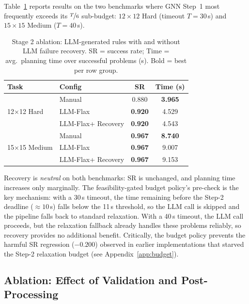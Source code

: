 \documentclass[letterpaper, 10pt, journal, twoside]{IEEEtran}
\newcommand{\tref}[1]{Table~\ref{#1}}
\newcommand{\method}{LLM-Flax\xspace}
\begin{document}
\tref{tab:stage2} reports results on the two benchmarks where GNN Step~1 most frequently exceeds its $\nicefrac{T}{6}$ sub-budget: $12{\times}12$ Hard (timeout $T{=}30$\,s) and $15{\times}15$ Medium ($T{=}40$\,s).

\begin{table}[t]
    \centering
    \caption{Stage 2 ablation: LLM-generated rules with and without LLM failure recovery. SR = success rate; Time = avg.\ planning time over successful problems (s). Bold = best per row group.}
    \label{tab:stage2}
    \small
    \setlength{\tabcolsep}{4pt}
    \renewcommand{\arraystretch}{1.1}
    \begin{tabular}{llcc}
        \toprule
        \textbf{Task} & \textbf{Config} & \textbf{SR} & \textbf{Time (s)} \\
        \midrule
        \multirow{3}{*}{12$\times$12 Hard}
            & Manual              & 0.880          & \textbf{3.965} \\
            & \method             & \textbf{0.920} & 4.529 \\
            & \method + Recovery  & \textbf{0.920} & 4.543 \\
        \midrule
        \multirow{3}{*}{15$\times$15 Medium}
            & Manual              & \textbf{0.967} & \textbf{8.740} \\
            & \method             & \textbf{0.967} & 9.007 \\
            & \method + Recovery  & \textbf{0.967} & 9.153 \\
        \bottomrule
    \end{tabular}
\end{table}

Recovery is \emph{neutral} on both benchmarks: SR is unchanged, and planning time increases only marginally.
The feasibility-gated budget policy's pre-check is the key mechanism: with a 30\,s timeout, the time remaining before the Step-2 deadline (${\approx}10$\,s) falls below the 11\,s threshold, so the LLM call is skipped and the pipeline falls back to standard relaxation.
With a 40\,s timeout, the LLM call proceeds, but the relaxation fallback already handles these problems reliably, so recovery provides no additional benefit.
Critically, the budget policy prevents the harmful SR regression ($-0.200$) observed in earlier implementations that starved the Step-2 relaxation budget (see Appendix~\ref{app:budget}).

\subsection{Ablation: Effect of Validation and Post-Processing}
\label{sec:ablation_pipeline}
\end{document}

